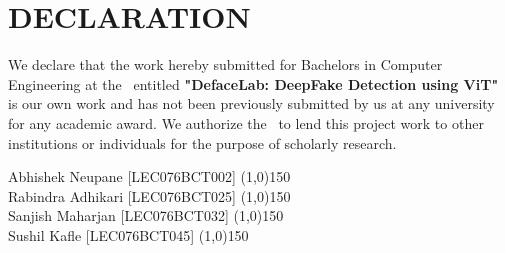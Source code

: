 \section*{DECLARATION}

We declare that the work hereby submitted for Bachelors in Computer Engineering at the \thecampus \ entitled \textbf{"DefaceLab:  DeepFake Detection using ViT"} is our own work and has not been previously submitted by us at any university for any academic award.
We authorize the \thecampus \ to lend this project work
to other institutions or individuals for the purpose of scholarly research.

\vspace{1cm}
\noindent Abhishek Neupane [LEC076BCT002] \space{}\space{}\space{}\space{}\space{}\space{}  \line(1,0){150}\\
Rabindra Adhikari [LEC076BCT025] \space{}\space{}\space{}\space{}\space{}\space{}\space{} \line(1,0){150} \\
Sanjish Maharjan [LEC076BCT032] \space{}\space{}\space{}\space{}\space{}\space{}\space{}\space{}\space{} \line(1,0){150} \\
Sushil Kafle [LEC076BCT045] \space{}\space{}\space{}\space{}\space{}\space{}\space{}\space{}\space{} \space{}\space{}\space{}\space{}\space{}\space{}\space{}\space{}\space{}\line(1,0){150}\\


\vspace{0.7cm}
\noindent \thedate \\
